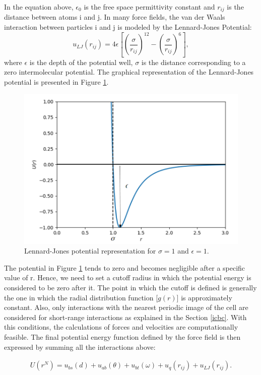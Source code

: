 In the equation above, $\epsilon _{0}$ is the free space permittivity constant and $r_{ij}$ is the distance between atoms i and j. In many force fields, the van der Waals interaction between particles i and j is modeled by the Lennard-Jones Potential:
\begin{equation}
u_{LJ}(r_{ij}) = 4 \epsilon
\left[ \left(\frac{\sigma}{r_{ij}} \right)^{12} - \left(\frac{\sigma}{r_{ij}} \right)^{6} \right],
\end{equation}
where  $\epsilon$ is the depth of the potential well, $\sigma$ is the distance corresponding to a zero intermolecular potential. The graphical representation of the Lennard-Jones potential is presented in Figure \ref{fig:lj}.
\begin{figure}[H]
	\centering
	\includegraphics[width=0.8\linewidth]{Figures/lj2}
	\caption{Lennard-Jones potential representation for $\sigma = 1$ and $\epsilon = 1$. }
	\label{fig:lj}
\end{figure}

The potential in Figure \ref{fig:lj} tends to zero and becomes negligible after a specific value of r. Hence, we need to set a cutoff radius in which the potential energy is considered to be zero after it. The point in which the cutoff is defined is generally the one in which the radial distribution function [$g(r)$] is approximately constant. Also, only interactions with the nearest periodic image of the cell are considered for short-range interactions as explained in the Section \ref{icbc}. With this conditions, the calculations of forces and velocities are computationally feasible. The final potential energy function defined by the force field is then expressed by summing all the interactions above:

\begin{equation}
\begin{aligned}
U(r^N) = u_{bs}(d) + u_{ab}(\theta) + u_{bt}(\omega) + u_{q}(r_{ij}) + u_{LJ}(r_{ij}) .
\end{aligned}
\end{equation}

